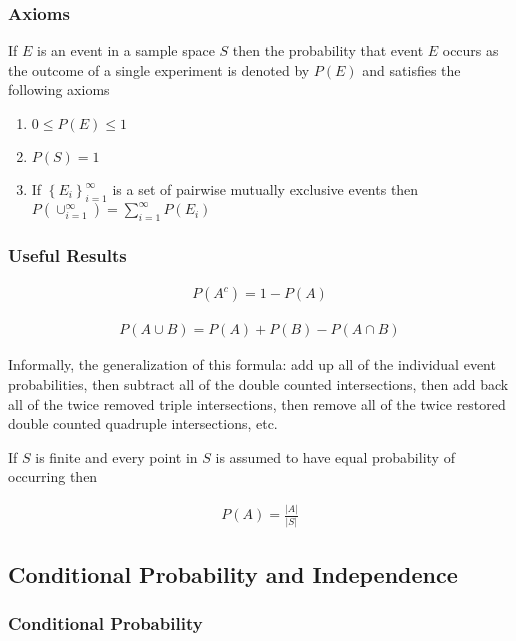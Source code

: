 \documentclass[10pt]{article}
\begin{document}
		\subsubsection*{Axioms}
		
		If $E$ is an event in a sample space $S$ then the probability that event $E$ occurs as the outcome of a single experiment is denoted by $P(E)$ and satisfies the following axioms
		
		\begin{enumerate}
			\item $0 \leq P(E) \leq 1$
			\item $P(S)=1$
			\item If $\left\{ E_i \right\}_{i=1}^\infty$ is a set of pairwise mutually exclusive events then $P(\cup_{i=1}^\infty)=\sum_{i=1}^\infty P(E_i)$
		\end{enumerate}
		
		\subsubsection*{Useful Results}
		
		\begin{align*}
			P(A^c) = 1 - P(A)
		\end{align*}
		
		\begin{align*}
			P(A \cup B) = P(A) + P(B) - P(A \cap B)
		\end{align*}
		
		\noindent Informally, the generalization of this formula: add up all of the individual event probabilities, then subtract all of the double counted intersections, then add back all of the twice removed triple intersections, then remove all of the twice restored double counted quadruple intersections, etc.
		
		If $S$ is finite and every point in $S$ is assumed to have equal probability of occurring then
		
		\begin{align*}
			 P(A) = \frac{|A|}{|S|}
		\end{align*}
		
		\subsection{Conditional Probability and Independence}
		
		\subsubsection*{Conditional Probability}
		
\end{document}
